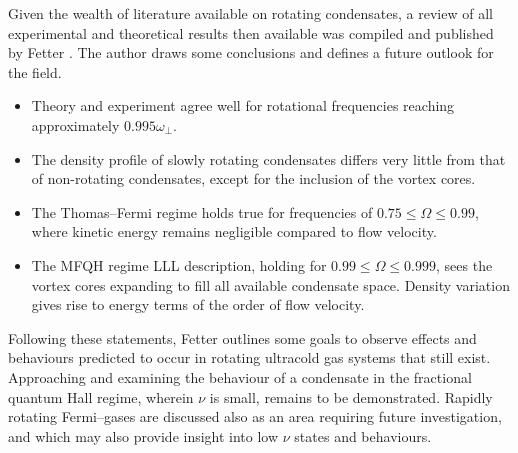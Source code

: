 Given the wealth of literature available on rotating condensates, a review of all experimental and theoretical results then available was compiled and published by Fetter \cite{BEC:Fetter_revmodphys_2009}. The author draws some conclusions and defines a future outlook for the field.
\begin{itemize}
\item Theory and experiment agree well for rotational frequencies reaching approximately $0.995\omega_{\perp}$.\vspace{-1em}
\item The density profile of slowly rotating condensates differs very little from that of non-rotating condensates, except for the inclusion of the vortex cores.\vspace{-1em}
\item The Thomas--Fermi regime holds true for frequencies of $0.75 \leq \Omega \leq 0.99$, where kinetic energy remains negligible compared to flow velocity.\vspace{-1em}
\item The MFQH regime LLL description, holding for $0.99 \leq \Omega \leq 0.999$, sees the vortex cores expanding to fill all available condensate space. Density variation gives rise to energy terms of the order of flow velocity.
\end{itemize}
Following these statements, Fetter outlines some goals to observe effects and behaviours predicted to occur in rotating ultracold gas systems that still exist. Approaching and examining the behaviour of a condensate in the fractional quantum Hall regime, wherein $\nu$ is small, remains to be demonstrated. Rapidly rotating Fermi--gases are discussed also as an area requiring future investigation, and which may also provide insight into low $\nu$ states and behaviours.

